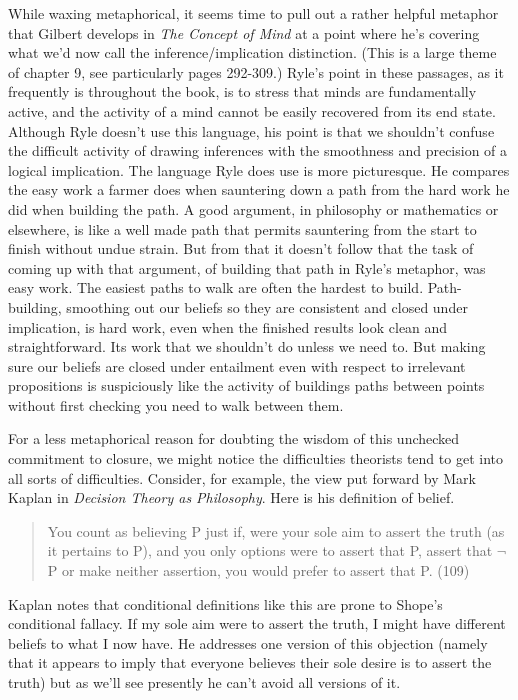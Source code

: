 While waxing metaphorical, it seems time to pull out a rather helpful metaphor that Gilbert \citeauthor{Ryle1949} develops in \textit{The Concept of Mind} at a point where he's covering what we'd now call the inference/implication distinction. (This is a large theme of chapter 9, see particularly pages 292-309.) Ryle's point in these passages, as it frequently is throughout the book, is to stress that minds are fundamentally active, and the activity of a mind cannot be easily recovered from its end state. Although Ryle doesn't use this language, his point is that we shouldn't confuse the difficult activity of drawing inferences with the smoothness and precision of a logical implication. The language Ryle does use is more picturesque. He compares the easy work a farmer does when sauntering down a path from the hard work he did when building the path. A good argument, in philosophy or mathematics or elsewhere, is like a well made path that permits sauntering from the start to finish without undue strain. But from that it doesn't follow that the task of coming up with that argument, of building that path in Ryle's metaphor, was easy work. The easiest paths to walk are often the hardest to build. Path-building, smoothing out our beliefs so they are consistent and closed under implication, is hard work, even when the finished results look clean and straightforward. Its work that we shouldn't do unless we need to. But making sure our beliefs are closed under entailment even with respect to irrelevant propositions is suspiciously like the activity of buildings paths between points without first checking you need to walk between them.

For a less metaphorical reason for doubting the wisdom of this unchecked commitment to closure, we might notice the difficulties theorists tend to get into all sorts of difficulties. Consider, for example, the view put forward by Mark Kaplan in \textit{Decision Theory as Philosophy}. Here is his definition of belief.

\begin{quote}
You count as believing P just if, were your sole aim to assert the truth (as it pertains to P), and you only options were to assert that P, assert that \(\neg\)P or make neither assertion, you would prefer to assert that P. (109)
\end{quote}

\noindent Kaplan notes that conditional definitions like this are prone to Shope's conditional fallacy. If my sole aim were to assert the truth, I might have different beliefs to what I now have. He addresses one version of this objection (namely that it appears to imply that everyone believes their sole desire is to assert the truth) but as we'll see presently he can't avoid all versions of it.

